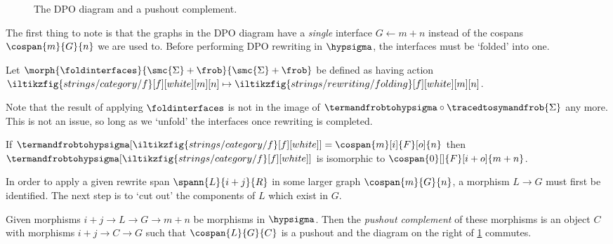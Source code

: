 \begin{figure}
    \centering
    \raisebox{1em}{}
    \qquad
    
    \caption{The DPO diagram and a pushout complement.}
    \label{fig:dpo}
\end{figure}

The first thing to note is that the graphs in the DPO diagram have a
\emph{single} interface \(G \leftarrow m + n\) instead of the cospans \(
    \cospan{m}{G}{n}
\) we are used to.
Before performing DPO rewriting in \(\hypsigma\), the interfaces must be
`folded' into one.

\begin{definition}
    Let \(\morph{\foldinterfaces}{\smc{\Sigma} + \frob}{\smc{\Sigma} + \frob}\)
    be defined as having action \(
        \iltikzfig{strings/category/f}[f][white][m][n]
        \mapsto
        \iltikzfig{strings/rewriting/folding}[f][white][m][n]
    \).
\end{definition}

Note that the result of applying \(\foldinterfaces\) is not in the image of \(
    \termandfrobtohypsigma \circ \tracedtosymandfrob{\Sigma}
\) any more.
This is not an issue, so long as we `unfold' the interfaces once rewriting is
completed.

\begin{proposition}
    If \(
        \termandfrobtohypsigma[\iltikzfig{strings/category/f}[f][white]]
        =
        \cospan{m}[i]{F}[o]{n}
    \) then \(
        \termandfrobtohypsigma[\iltikzfig{strings/category/f}[f][white]]
    \) is isomorphic to \(
        \cospan{0}[]{F}[i+o]{m+n}
    \).
\end{proposition}

In order to apply a given rewrite span \(\spann{L}{i+j}{R}\) in some larger
graph \(\cospan{m}{G}{n}\), a morphism \(L \to G\) must first be identified.
The next step is to `cut out' the components of \(L\) which exist in \(G\).

\begin{definition}\label{def:pushout-complement}
    Given morphisms \(i + j \to L \to G \rightarrow m + n\) be morphisms in
    \(\hypsigma\).
    Then the \emph{pushout complement} of these morphisms is an object \(C\)
    with morphisms \(i + j \to C \to G\) such that \(\cospan{L}{G}{C}\) is a
    pushout and the diagram on the right of \cref{fig:dpo} commutes.
\end{definition}

